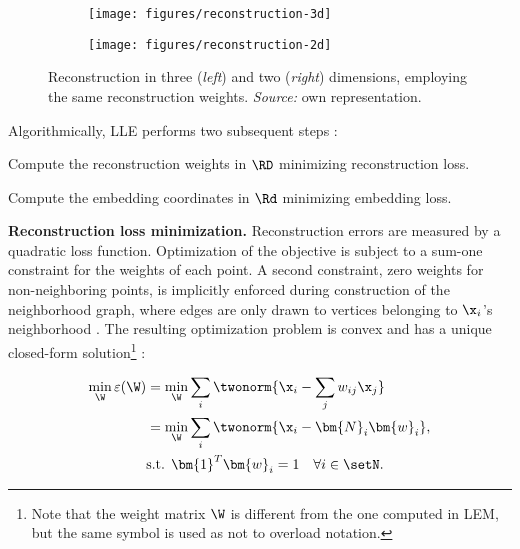 \begin{figure}[H]
 \centering
 \begin{subfigure}[b]{0.48\textwidth}
   \centering
   \texttt{[image: figures/reconstruction-3d]}
 \end{subfigure}
 \hfill
 \begin{subfigure}[b]{0.48\textwidth}
   \centering
   \texttt{[image: figures/reconstruction-2d]}
 \end{subfigure}
  \caption[Linear reconstruction in LLE]{Reconstruction in three (\textit{left}) 
  and two (\textit{right}) 
  dimensions, employing the same reconstruction weights. \textit{Source:} own
  representation.}
  \label{fig-reconstruction}
\end{figure}

Algorithmically, LLE performs two subsequent steps \citep{roweissaul2000}:

\begin{tight_enumerate}
  \item Compute the reconstruction weights in $\RD$ minimizing reconstruction 
  loss.
  \item Compute the embedding coordinates in $\Rd$ minimizing embedding loss.
\end{tight_enumerate}

\textbf{Reconstruction loss minimization.}
Reconstruction errors are measured by a quadratic loss function.
Optimization of the objective is subject to a sum-one constraint for the weights
of each point.
A second constraint, zero weights for non-neighboring points, is implicitly
enforced during construction of the neighborhood graph, where edges are only
drawn to vertices belonging to $\x_i$'s neighborhood \citep{ghojoghetal2020}.
The resulting optimization problem is convex and has a unique
closed-form solution\footnote{
Note that the weight matrix $\W$ is different from the one computed in
LEM, but the same symbol is used as not to overload notation.
} \citep{roweissaul2000}:

\begin{equation}
  \begin{split}
    \min_{\W} \varepsilon(\W) &= \min_{\W} \sum_i
    \twonorm{\x_i - \sum_j w_{ij} \x_j} \\
    &= \min_{\W} \sum_i \twonorm{\x_i - \bm{N}_i \bm{w}_i}, \\
    & \text{s.t. } \bm{1}^T \bm{w}_i = 1 \quad \forall i \in \setN.
  \end{split}
  \label{eq-obj-lle-recon}
\end{equation}

